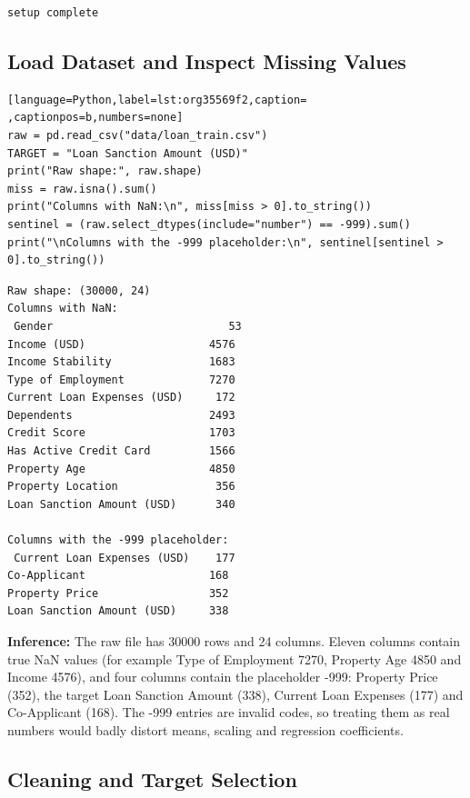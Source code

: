 \documentclass[11pt]{article}
\begin{document}
\begin{verbatim}
setup complete
\end{verbatim}

\subsection*{Load Dataset and Inspect Missing Values}
\label{sec:org263eb04}

\begin{lstlisting}[language=Python,label=lst:org35569f2,caption= ,captionpos=b,numbers=none]
raw = pd.read_csv("data/loan_train.csv")
TARGET = "Loan Sanction Amount (USD)"
print("Raw shape:", raw.shape)
miss = raw.isna().sum()
print("Columns with NaN:\n", miss[miss > 0].to_string())
sentinel = (raw.select_dtypes(include="number") == -999).sum()
print("\nColumns with the -999 placeholder:\n", sentinel[sentinel > 0].to_string())
\end{lstlisting}

\begin{verbatim}
Raw shape: (30000, 24)
Columns with NaN:
 Gender                           53
Income (USD)                   4576
Income Stability               1683
Type of Employment             7270
Current Loan Expenses (USD)     172
Dependents                     2493
Credit Score                   1703
Has Active Credit Card         1566
Property Age                   4850
Property Location               356
Loan Sanction Amount (USD)      340

Columns with the -999 placeholder:
 Current Loan Expenses (USD)    177
Co-Applicant                   168
Property Price                 352
Loan Sanction Amount (USD)     338
\end{verbatim}

\textbf{Inference:} The raw file has 30000 rows and 24 columns. Eleven columns contain true NaN values (for
example Type of Employment 7270, Property Age 4850 and Income 4576), and four columns
contain the placeholder -999: Property Price (352), the target Loan Sanction Amount (338),
Current Loan Expenses (177) and Co-Applicant (168). The -999 entries are invalid codes, so
treating them as real numbers would badly distort means, scaling and regression
coefficients.

\subsection*{Cleaning and Target Selection}
\label{sec:org4735384}
\end{document}

